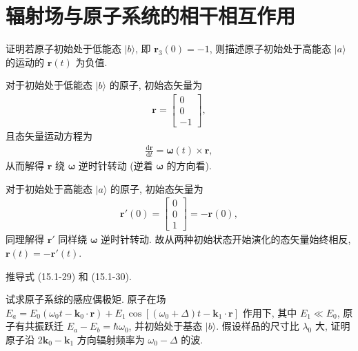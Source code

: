 \documentclass{note}
\begin{document}
\fi
\setcounter{chapter}{14}
\chapter{辐射场与原子系统的相干相互作用}
\begin{exe}
    证明若原子初始处于低能态 $\lvert b\rangle$, 即 $\bm{r}_3(0)=-1$, 则描述原子初始处于高能态 $\lvert a\rangle$ 的运动的 $\bm{r}(t)$ 为负值.
\end{exe}
\begin{pf}
    对于初始处于低能态 $\lvert b\rangle$ 的原子, 初始态矢量为
    \begin{align}
        \bm{r}=\begin{bmatrix}
            0\\
            0\\
            -1
        \end{bmatrix},
    \end{align}
    且态矢量运动方程为
    \begin{align}
        \frac{\mathrm{d}\bm{r}}{\mathrm{d}t}=\bm{\omega}(t)\times\bm{r},
    \end{align}
    从而解得 $\bm{r}$ 绕 $\bm{\omega}$ 逆时针转动 (逆着 $\bm{\omega}$ 的方向看).

    对于初始处于高能态 $\lvert a\rangle$ 的原子, 初始态矢量为
    \begin{align}
        \bm{r}'(0)=\begin{bmatrix}
            0\\
            0\\
            1
        \end{bmatrix}=-\bm{r}(0),
    \end{align}
    同理解得 $\bm{r}'$ 同样绕 $\bm{\omega}$ 逆时针转动.
    故从两种初始状态开始演化的态矢量始终相反, $\bm{r}(t)=-\bm{r}'(t)$.
\end{pf}

\begin{exe}
    推导式 (15.1-29) 和 (15.1-30).
\end{exe}
\begin{pf}
    
\end{pf}

\begin{exe}
    试求原子系综的感应偶极矩. 原子在场 $E_a=E_0(\omega_0t-\bm{k}_0\cdot\bm{r})+E_1\cos[(\omega_0+\Delta)t-\bm{k}_1\cdot\bm{r}]$ 作用下, 其中 $E_1\ll E_0$, 原子有共振跃迁 $E_a-E_b=\hbar\omega_0$, 并初始处于基态 $\lvert b\rangle$. 假设样品的尺寸比 $\lambda_0$ 大, 证明原子沿 $2\bm{k}_0-\bm{k}_1$ 方向辐射频率为 $\omega_0-\Delta$ 的波.
\end{exe}
\begin{sol}

\end{sol}
\end{document}
